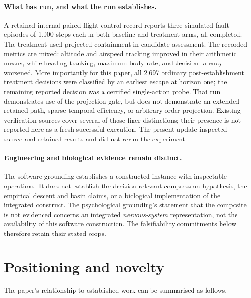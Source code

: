 \documentclass[11pt,a4paper]{article}
\theoremstyle{remark}
\begin{document}
\paragraph{What has run, and what the run establishes.}
A retained internal paired flight-control record reports three simulated fault
episodes of 1,000 steps each in both baseline and treatment arms, all completed.
The treatment used projected containment in candidate assessment. The recorded
metrics are mixed: altitude and airspeed tracking improved in their arithmetic
means, while heading tracking, maximum body rate, and decision latency worsened.
More importantly for this paper, all 2,697 ordinary post-establishment treatment
decisions were classified by an earliest escape at horizon one; the remaining
reported decision was a certified single-action probe. That run demonstrates use
of the projection gate, but does not demonstrate an extended retained path,
sparse temporal efficiency, or arbitrary-order projection. Existing verification
sources cover several of those finer distinctions; their presence is not reported
here as a fresh successful execution. The present update inspected source and
retained results and did not rerun the experiment.

\paragraph{Engineering and biological evidence remain distinct.}
The software grounding establishes a constructed instance with inspectable
operations. It does not establish the decision-relevant compression hypothesis,
the empirical descent and basin claims, or a biological implementation of the
integrated construct. The psychological grounding's statement that the composite
is not evidenced concerns an integrated \emph{nervous-system} representation, not
the availability of this software construction. The falsifiability commitments
below therefore retain their stated scope.

\section{Positioning and novelty}\label{sec:positioning}

The paper's relationship to established work can be summarised as follows.
\end{document}
